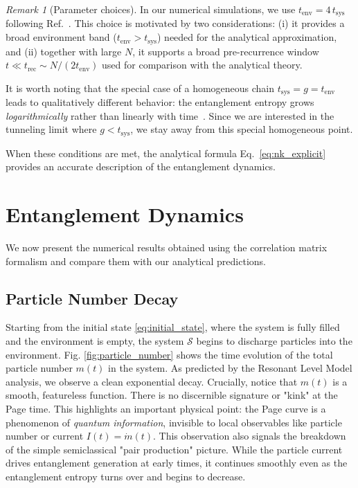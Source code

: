 \documentclass[12pt,oneside,openright]{report}
\theoremstyle{definition}
\theoremstyle{plain}
\theoremstyle{remark}
\newtheorem{remark}{Remark}[chapter]
\begin{document}
\begin{remark}[Parameter choices]
In our numerical simulations, we use $t_{\mathrm{env}} = 4\, t_{\mathrm{sys}}$ following Ref.~\cite{Kehrein_2024}. This choice 
is motivated by two considerations: (i) it provides a broad environment band ($t_{\mathrm{env}} > t_{\mathrm{sys}}$) 
needed for the analytical approximation, and (ii) together with large \(N\), it supports a broad pre-recurrence window
\(t\ll t_{\mathrm{rec}}\sim N/(2t_{\mathrm{env}})\) used for comparison with the analytical theory.

It is worth noting that the special case of a homogeneous chain $t_{\mathrm{sys}} = g = t_{\mathrm{env}}$ leads to 
qualitatively different behavior: the entanglement entropy grows \emph{logarithmically} rather than linearly 
with time~\cite{Eisler_2012}. Since we are interested in the tunneling limit where $g < t_{\mathrm{sys}}$, we 
stay away from this special homogeneous point.
\end{remark}

When these conditions are met, the analytical formula Eq.~\eqref{eq:nk_explicit} provides an accurate description of the entanglement dynamics.

\section{Entanglement Dynamics}

We now present the numerical results obtained using the correlation matrix formalism and compare them with our analytical predictions.

\subsection{Particle Number Decay}
Starting from the initial state \eqref{eq:initial_state}, where the system is fully filled and the environment is empty, the system $\mathcal{S}$ begins to discharge particles into the environment. Fig. \ref{fig:particle_number} shows the time evolution of the total particle number $m(t)$ in the system.
As predicted by the Resonant Level Model analysis, we observe a clean exponential decay. Crucially, notice that $m(t)$ is a smooth, featureless function. There is no discernible signature or "kink" at the Page time. This highlights an important physical point: the Page curve is a phenomenon of \emph{quantum information}, invisible to local observables like particle number or current $I(t) = \dot{m}(t)$.
This observation also signals the breakdown of the simple semiclassical "pair production" picture. While the particle current drives entanglement generation at early times, it continues smoothly even as the entanglement entropy turns over and begins to decrease.
\end{document}
